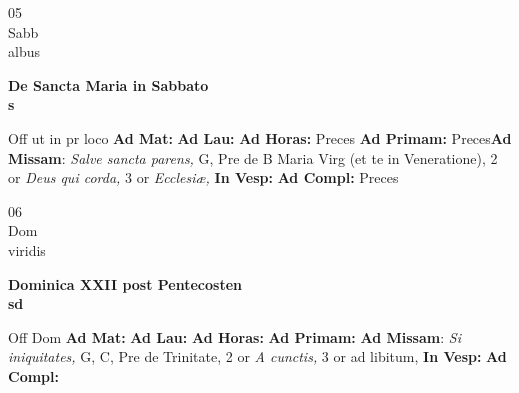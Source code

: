 \documentclass[10pt, openany]{book}
\begin{document}
    \begin{center}
        \begin{minipage}{3.5in}
            \vspace{2em}
            \begin{minipage}{0.5in}
                {\Huge 05} \\
                {\normalsize Sabb} \\
                {\normalsize albus}
            \end{minipage}
            \begin{minipage}{3.0in}
                \textbf{ \large De Sancta Maria in Sabbato \\
                \textnormal{\normalsize s}} \\ 
            \end{minipage}
            \begin{justify}Off ut in pr loco
                \textbf{Ad Mat: }
                \textbf{Ad Lau: }
                \textbf{Ad Horas: }Preces
                \textbf{Ad Primam: }Preces\textbf{Ad Missam}: \textit{Salve sancta parens,} G, Pre de B Maria Virg (et te in Veneratione), 2 or \textit{Deus qui corda,} 3 or \textit{Ecclesiæ,}  
                \textbf{In Vesp: }
                \textbf{Ad Compl: }Preces
            \end{justify}
        \end{minipage}
    \end{center}

    \begin{center}
        \begin{minipage}{3.5in}
            \vspace{2em}
            \begin{minipage}{0.5in}
                {\Huge 06} \\
                {\normalsize Dom} \\
                {\normalsize viridis}
            \end{minipage}
            \begin{minipage}{3.0in}
                \textbf{ \large Dominica XXII post Pentecosten \\
                \textnormal{\normalsize sd}} \\ 
            \end{minipage}
            \begin{justify}Off Dom
                \textbf{Ad Mat: }
                \textbf{Ad Lau: }
                \textbf{Ad Horas: }
                \textbf{Ad Primam: }\textbf{Ad Missam}: \textit{Si iniquitates,} G, C, Pre de Trinitate, 2 or \textit{A cunctis,} 3 or ad libitum,  
                \textbf{In Vesp: }
                \textbf{Ad Compl: }
            \end{justify}
        \end{minipage}
    \end{center}
\end{document}
